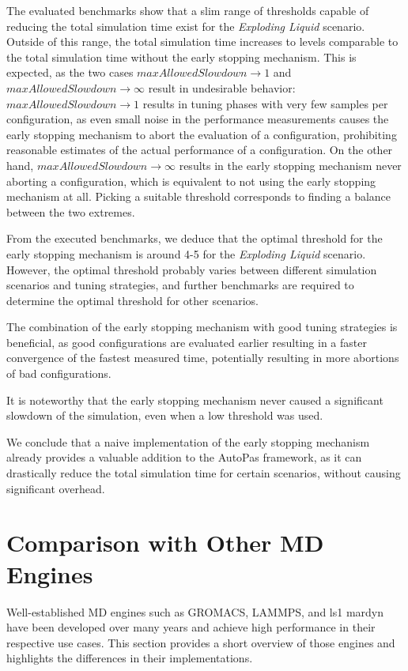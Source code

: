 \documentclass[conference]{IEEEtran}
\begin{document}
The evaluated benchmarks show that a slim range of thresholds capable of reducing the total simulation time exist for the \textit{Exploding Liquid} scenario.
Outside of this range, the total simulation time increases to levels comparable to the total simulation time without the early stopping mechanism. This is expected, as the two cases $maxAllowedSlowdown \to 1$ and $maxAllowedSlowdown \to \infty$ result in undesirable behavior: $maxAllowedSlowdown \to 1$ results in tuning phases with very few samples per configuration, as even small noise in the performance measurements causes the early stopping mechanism to abort the evaluation of a configuration, prohibiting reasonable estimates of the actual performance of a configuration. On the other hand, $maxAllowedSlowdown \to \infty$ results in the early stopping mechanism never aborting a configuration, which is equivalent to not using the early stopping mechanism at all. Picking a suitable threshold corresponds to finding a balance between the two extremes.

From the executed benchmarks, we deduce that the optimal threshold for the early stopping mechanism is around 4-5 for the \textit{Exploding Liquid} scenario. However, the optimal threshold probably varies between different simulation scenarios and tuning strategies, and further benchmarks are required to determine the optimal threshold for other scenarios.

The combination of the early stopping mechanism with good tuning strategies is beneficial, as good configurations are evaluated earlier resulting in a faster convergence of the fastest measured time, potentially resulting in more abortions of bad configurations.

It is noteworthy that the early stopping mechanism never caused a significant slowdown of the simulation, even when a low threshold was used.

We conclude that a naive implementation of the early stopping mechanism already provides a valuable addition to the AutoPas framework, as it can drastically reduce the total simulation time for certain scenarios, without causing significant overhead.


\section{Comparison with Other MD Engines}

Well-established MD engines such as GROMACS, LAMMPS, and ls1 mardyn have been developed over many years and achieve high performance in their respective use cases. This section provides a short overview of those engines and highlights the differences in their implementations.
\end{document}
